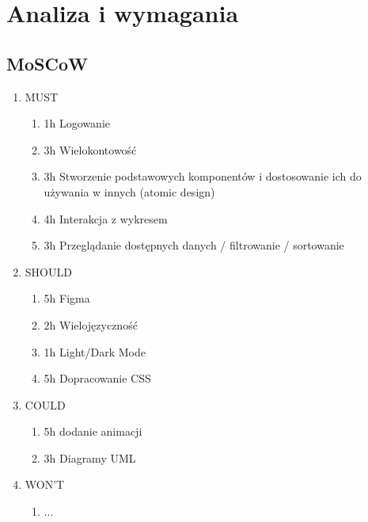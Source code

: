 \documentclass[a4paper,11pt]{article}
\begin{document}
\maketitle

\section{Analiza i wymagania}
\subsection{MoSCoW}


\begin{enumerate}
    \item MUST
    \begin{enumerate}
        \item 1h Logowanie
        \item 3h Wielokontowość
        \item 3h Stworzenie podstawowych komponentów i dostosowanie ich do używania w innych (atomic design)
        \item 4h Interakcja z wykresem
        \item 3h Przeglądanie dostępnych danych / filtrowanie / sortowanie
    \end{enumerate}
    \item SHOULD
    \begin{enumerate}
        \item 5h Figma
        \item 2h Wielojęzyczność
        \item 1h Light/Dark Mode
        \item 5h Dopracowanie CSS
    \end{enumerate}
    \item COULD
    \begin{enumerate}
        \item 5h dodanie animacji
        \item 3h Diagramy UML  
    \end{enumerate}
    \item WON'T
    \begin{enumerate}
        \item ...
        
    \end{enumerate}
\end{enumerate}
\end{document}
